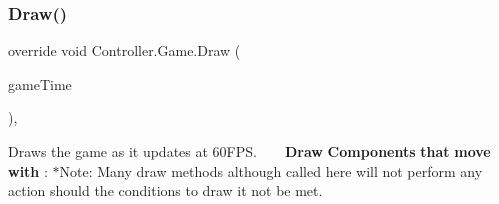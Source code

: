 \subsubsection{\texorpdfstring{Draw()}{Draw()}}
{\footnotesize\ttfamily override void Controller.\+Game.\+Draw (\begin{DoxyParamCaption}\item[{Game\+Time}]{game\+Time }\end{DoxyParamCaption})\hspace{0.3cm}{\ttfamily [inline]}, {\ttfamily [protected]}}

Draws the game as it updates at 60\+F\+PS. ~\newline
~\newline
 {\bfseries Draw} {\bfseries Components} {\bfseries that} {\bfseries move} {\bfseries with} \+: $\ast$\+Note\+: Many draw methods although called here will not perform any action should the conditions to draw it not be met.
